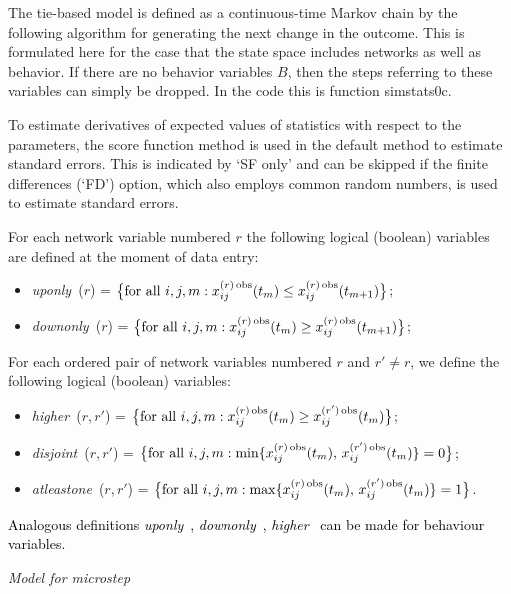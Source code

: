 \documentclass[a4paper,12pt,fleqn]{article}
\newcommand{\nm}[1]{\textsf{\small #1}}
\newcommand{\nnm}[1]{\textsf{\small\textit{#1}\ }}
\newcommand{\addce}[1]{{\textcolor[named]{Black}{#1}}}
\begin{document}
The tie-based model is defined as a continuous-time Markov chain by the following
algorithm for generating the next change in the outcome.
This is formulated here for the case that the state space includes networks as well as behavior.
If there are no behavior variables $B$, then the steps referring to these variables
can simply be dropped.
In the code this is function \nm{simstats0c}.

To estimate derivatives of expected values of statistics with respect to the
parameters, the score function method
\citep{SchweinbergerSnijders07a}
is used in the default method to estimate standard errors.
This is indicated by `SF only' and
can be skipped if the
finite differences (`FD') option, which also employs common random numbers,
is used to estimate standard errors.

For each network variable numbered $r$ the following logical (boolean)
variables are defined at the moment of data entry:
\begin{itemize}
\item \nnm{uponly}($r$) = $\big\{\text{for all }i, j, m:
                         x^{(r)\,\rm{obs}}_{ij}(t_{m})  \leq  x^{(r)\,\rm{obs}}_{ij}(t_{m+1}) \big\}$;
\item \nnm{downonly}($r$) = $\big\{\text{for all }i, j, m:
                         x^{(r)\,\rm{obs}}_{ij}(t_{m})  \geq  x^{(r)\,\rm{obs}}_{ij}(t_{m+1}) \big\}$;
\end{itemize}
For each ordered pair of network variables numbered $r$ and $r' \neq r$,
we define the following logical (boolean) variables:
\begin{itemize}
\item \nnm{higher}($r, r'$) = $\big\{\text{for all }i, j, m:
                         x^{(r)\,\rm{obs}}_{ij}(t_{m})  \geq  x^{(r')\,\rm{obs}}_{ij}(t_{m}) \big\}$;
\item  \nnm{disjoint}($r, r'$) = $\big\{\text{for all }i, j, m:
                       \min\{  x^{(r)\,\rm{obs}}_{ij}(t_{m}), \,
                           x^{(r')\,\rm{obs}}_{ij}(t_{m}) \} = 0 \big\}$;
\item \nnm{atleastone}($r, r'$) = $\big\{\text{for all }i, j, m:
                       \max\{  x^{(r)\,\rm{obs}}_{ij}(t_{m}), \,
                           x^{(r')\,\rm{obs}}_{ij}(t_{m}) \} = 1 \big\}$.
\end{itemize}
\addce{Analogous definitions \nnm{uponly}, \nnm{downonly},
\nnm{higher} can be made for behaviour variables.}


\emph{Model for microstep}
\end{document}
